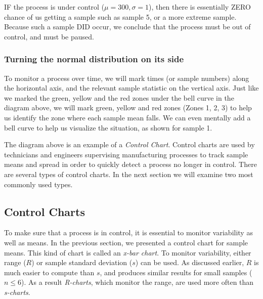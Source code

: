 \documentclass{ximera}
\begin{document}
\begin{idea}
IF the process is under control ($\mu=300, \sigma=1$), then there is essentially ZERO chance of us getting a sample such as sample 5, or a more extreme sample.  Because such a sample DID occur, we conclude that the process must be out of control, and must be paused.
\end{idea}

\subsubsection*{Turning the normal distribution on its side}

To monitor a process over time, we will mark times (or sample numbers) along the horizontal axis, and the relevant sample statistic on the vertical axis.  Just like we marked the green, yellow and the red zones under the bell curve in the diagram above, we will mark green, yellow and red zones (Zones 1, 2, 3) to help us identify the zone where each sample mean falls.  We can even mentally add a bell curve to help us visualize the situation, as shown for sample 1.

\begin{onlineOnly}
\begin{center}
\end{center}
\end{onlineOnly}

The diagram above is an example of a \emph{Control Chart}.  Control charts are used by technicians and engineers supervising manufacturing processes to track sample means and spread in order to quickly detect a process no longer in control.  There are several types of control charts.  In the next section we will examine two most commonly used types.

\subsection*{Control Charts}

To make sure that a process is in control, it is essential to monitor variability as well as means.  In the previous section, we presented a control chart for sample means.  This kind of chart is called an \emph{x-bar chart}.  To monitor variability, either range ($R$) or sample standard deviation ($s$) can be used.  As discussed earlier, $R$ is much easier to compute than $s$, and produces similar results for small samples ($n\leq 6$).  As a result \emph{R-charts}, which monitor the range, are used more often than \emph{s-charts}.
\end{document}
